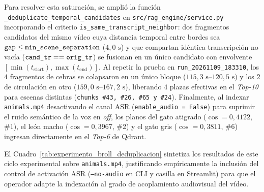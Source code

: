 \begin{enumerate}
    Para resolver esta saturación, se amplió la función \texttt{\_deduplicate\_temporal\_candidates} en \texttt{src/rag\_engine/service.py} incorporando el criterio \texttt{is\_same\_transcript\_neighbor}: dos fragmentos candidatos del mismo vídeo cuya distancia temporal entre bordes sea $\text{\texttt{gap}} \le \text{\texttt{min\_scene\_separation}}$ ($4,0\text{ s}$) y que compartan idéntica transcripción no vacía ($\text{\texttt{cand\_tr}} == \text{\texttt{orig\_tr}}$) se fusionan en un único candidato con envolvente $[\min(t_{\text{start}}), \max(t_{\text{end}})]$.
    Al repetir la prueba en \texttt{run\_20261109\_183310}, los $4$ fragmentos de cebras se colapsaron en un único bloque ($115,3\text{ s--}120,5\text{ s}$) y los $2$ de circulación en otro ($159,0\text{ s--}167,2\text{ s}$), liberando $4$ plazas efectivas en el \textit{Top-10} para escenas distintas (\texttt{chunks \#43, \#26, \#65 y \#24}).
    Finalmente, al indexar \texttt{animals.mp4} desactivando el canal ASR (\texttt{enable\_audio = False}) para suprimir el ruido semántico de la voz en \textit{off}, los planos del gato atigrado ($\cos = 0,4122$, \#1), el león macho ($\cos = 0,3967$, \#2) y el gato gris ($\cos = 0,3811$, \#6) ingresan directamente en el \textit{Top-6} de Qdrant.
\end{enumerate}

El Cuadro~\ref{tab:experimento_broll_deduplicacion} sintetiza los resultados de este ciclo experimental sobre \texttt{animals.mp4}, justificando empíricamente la inclusión del control de activación ASR (\texttt{--no-audio} en CLI y casilla en Streamlit) para que el operador adapte la indexación al grado de acoplamiento audiovisual del vídeo.

